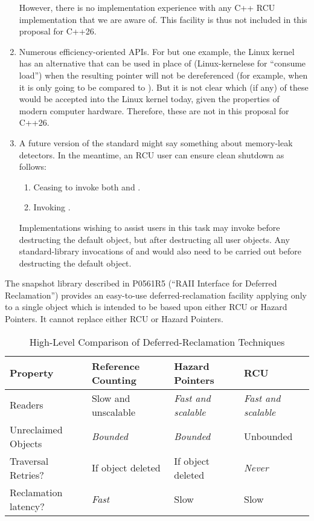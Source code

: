 \begin{enumerate}
	However, there is no implementation experience with any C++
	RCU implementation that we are aware of.
	This facility is thus not included in this proposal for C++26.
\item	Numerous efficiency-oriented APIs.
	For but one example, the Linux kernel has an alternative
	 that can be used in place
	of  (Linux-kernelese for ``consume load'')
	when the resulting pointer will not be dereferenced
	(for example, when it is only going to be compared to ).
	But it is not clear which (if any) of these would be accepted
	into the Linux kernel today, given the properties of modern
	computer hardware.
	Therefore, these are not in this proposal for C++26.
\item	A future version of the standard might say something about
	memory-leak detectors.
	In the meantime, an RCU user can ensure clean shutdown as follows:
	\begin{enumerate}
	\item	Ceasing to invoke both  and
		.
	\item	Invoking .
	\end{enumerate}
	Implementations wishing to assist users in this task may
	invoke  before destructing the default
	 object, but after destructing all user objects.
	Any standard-library invocations of  and
	 would also need to be carried out before
	destructing the default  object.
\end{enumerate}

The snapshot library described in P0561R5 (``RAII Interface for Deferred
Reclamation'') provides an easy-to-use deferred-reclamation facility
applying only to a single object which is intended to be based upon
either RCU or Hazard Pointers.
It cannot replace either RCU or Hazard Pointers.

\begin{table*}
\renewcommand*{\arraystretch}{1.25}
\footnotesize
\centering
\begin{tabular}{l|lll}
	Property
		& Reference Counting
			& Hazard Pointers
				& RCU \\
	\hline
	\hline
	Readers
		& Slow and unscalable
			& \emph{Fast and scalable}
				& \emph{Fast and scalable} \\
	\hline
	Unreclaimed Objects
		& \emph{Bounded}
			& \emph{Bounded}
				& Unbounded \\
	\hline
	Traversal Retries?
		& If object deleted
			& If object deleted
				& \emph{Never} \\
	\hline
	Reclamation latency?
		& \emph{Fast}
			& Slow
				& Slow \\
\end{tabular}
\caption{High-Level Comparison of Deferred-Reclamation Techniques}
\label{tab:High-Level Comparison of Deferred-Reclamation Techniques}
\end{table*}

